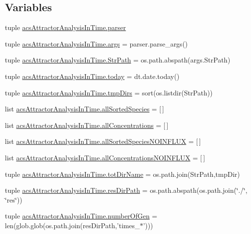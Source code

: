 \subsection*{Variables}
\begin{DoxyCompactItemize}
\item 
tuple \hyperlink{a00125_abed547533f84e18ca5b4c4a2cfaef63a}{acs\+Attractor\+Analysis\+In\+Time.\+parser}
\item 
tuple \hyperlink{a00125_ab6621347b1ac2fe0e436bd2f384af8dc}{acs\+Attractor\+Analysis\+In\+Time.\+args} = parser.\+parse\+\_\+args()
\item 
tuple \hyperlink{a00125_a1d168f4d444ea1d02f186a7568344fba}{acs\+Attractor\+Analysis\+In\+Time.\+Str\+Path} = os.\+path.\+abspath(args.\+Str\+Path)
\item 
tuple \hyperlink{a00125_af30cd903eabfe4c9167f2a5d0062a4ce}{acs\+Attractor\+Analysis\+In\+Time.\+today} = dt.\+date.\+today()
\item 
tuple \hyperlink{a00125_a4f312756a4e405be853b0a84be7e2e54}{acs\+Attractor\+Analysis\+In\+Time.\+tmp\+Dirs} = sort(os.\+listdir(Str\+Path))
\item 
list \hyperlink{a00125_aceddba8afb0eb0cc7ba102491a9a3c30}{acs\+Attractor\+Analysis\+In\+Time.\+all\+Sorted\+Species} = \mbox{[}$\,$\mbox{]}
\item 
list \hyperlink{a00125_a8c439282d32e80d2e2d4c02cc36f1101}{acs\+Attractor\+Analysis\+In\+Time.\+all\+Concentrations} = \mbox{[}$\,$\mbox{]}
\item 
list \hyperlink{a00125_a48013e92108a94a85d1e32c2397eb37c}{acs\+Attractor\+Analysis\+In\+Time.\+all\+Sorted\+Species\+N\+O\+I\+N\+F\+L\+U\+X} = \mbox{[}$\,$\mbox{]}
\item 
list \hyperlink{a00125_af6dd7a5a396717328c091d96d629af7c}{acs\+Attractor\+Analysis\+In\+Time.\+all\+Concentrations\+N\+O\+I\+N\+F\+L\+U\+X} = \mbox{[}$\,$\mbox{]}
\item 
tuple \hyperlink{a00125_aeed4ca0c266fb5e31aebbbbe2f389378}{acs\+Attractor\+Analysis\+In\+Time.\+tot\+Dir\+Name} = os.\+path.\+join(Str\+Path,tmp\+Dir)
\item 
tuple \hyperlink{a00125_a28ca19f0f566396ef664e068a41a2837}{acs\+Attractor\+Analysis\+In\+Time.\+res\+Dir\+Path} = os.\+path.\+abspath(os.\+path.\+join(\char`\"{}./\char`\"{}, \char`\"{}res\char`\"{}))
\item 
tuple \hyperlink{a00125_a28cc280ff54c726bd790cf781d3bab8c}{acs\+Attractor\+Analysis\+In\+Time.\+number\+Of\+Gen} = len(glob.\+glob(os.\+path.\+join(res\+Dir\+Path,'times\+\_\+$\ast$')))

\end{DoxyCompactItemize}
